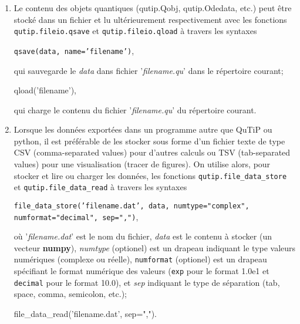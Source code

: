 \begin{enumerate}
\item Le contenu des objets quantiques  (qutip.Qobj, qutip.Odedata, etc.) peut 
être stocké dans un fichier et lu ultérieurement respectivement avec les 
fonctions \texttt{qutip.fileio.qsave} et \texttt{qutip.fileio.qload} à travers 
les syntaxes 

\begin{center}
\texttt{qsave(data, name='filename')},
\end{center}
qui sauvegarde le \emph{data} dans fichier '\emph{filename.qu}' dans le 
répertoire courant;
\begin{center}
qload('filename'),
\end{center}
qui charge le contenu du fichier '\emph{filename.qu}' du répertoire courant.

\item Lorsque les données exportées dans un programme autre que QuTiP ou 
python, il est préférable de les stocker sous forme d'un fichier texte de 
type CSV (comma-separated values) pour d'autres calculs ou TSV (tab-separated 
values) pour une visualisation (tracer de figures). On utilise alors, pour 
stocker et lire ou charger les données, les fonctions 
\texttt{qutip.file\_data\_store} et \texttt{qutip.file\_data\_read} à travers 
les syntaxes
\begin{center}
\texttt{file\_data\_store('filename.dat', data, numtype="complex", 
numformat="decimal", sep=",")},
\end{center}
où '\emph{filename.dat}' est le nom du fichier, \emph{data} est le contenu à 
stocker (un vecteur \textbf{numpy}), \emph{numtype} (optionel) est un drapeau 
indiquant le type valeurs numériques (complexe ou réelle), \texttt{numformat} 
(optionel) est un drapeau spécifiant le format numérique des valeurs 
(\texttt{exp} pour le format 1.0e1 et \texttt{decimal} pour le format 
10.0), et \emph{sep} indiquant le type de séparation (tab, space, comma, 
semicolon, etc.);

\begin{center}
file\_data\_read('filename.dat', sep=",").
\end{center}
\end{enumerate}
